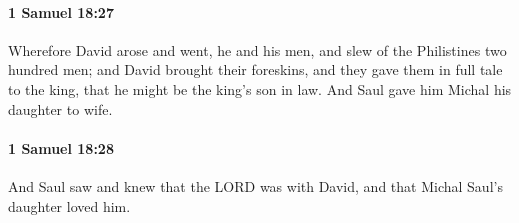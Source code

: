 		\paragraph{1 Samuel 18:27} %
			\label{1SAMUEL-18-27}

			Wherefore David arose and went, he and his men, and slew of the Philistines two hundred men; and David brought their foreskins, and they gave them in full tale to the king, that he might be the king’s son in law. And Saul gave him Michal his daughter to wife.


		\paragraph{1 Samuel 18:28} %
			\label{1SAMUEL-18-28}

			And Saul saw and knew that the LORD was with David, and that Michal Saul’s daughter loved him.


